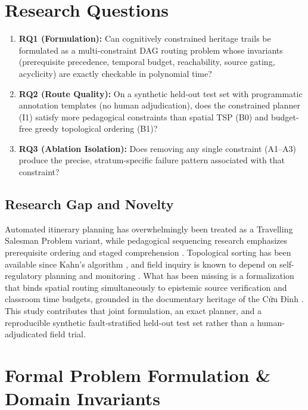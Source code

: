 \documentclass[11pt,a4paper]{article}
\begin{document}
\section{Research Questions}

\begin{enumerate}[label=\textbf{RQ\arabic*}, leftmargin=2.4em]
    \item \textbf{RQ1 (Formulation):} Can cognitively constrained heritage trails be formulated as a multi-constraint DAG routing problem whose invariants (prerequisite precedence, temporal budget, reachability, source gating, acyclicity) are exactly checkable in polynomial time?
    \item \textbf{RQ2 (Route Quality):} On a synthetic held-out test set with programmatic annotation templates (no human adjudication), does the constrained planner (I1) satisfy more pedagogical constraints than spatial TSP (B0) and budget-free greedy topological ordering (B1)?
    \item \textbf{RQ3 (Ablation Isolation):} Does removing any single constraint (A1--A3) produce the precise, stratum-specific failure pattern associated with that constraint?
\end{enumerate}

\subsection{Research Gap and Novelty}

Automated itinerary planning has overwhelmingly been treated as a Travelling Salesman Problem variant, while pedagogical sequencing research emphasizes prerequisite ordering and staged comprehension \cite{moet2018gdpt}. Topological sorting has been available since Kahn's algorithm \cite{kahn1962topological}, and field inquiry is known to depend on self-regulatory planning and monitoring \cite{zimmerman2000self}. What has been missing is a formalization that binds spatial routing simultaneously to epistemic source verification and classroom time budgets, grounded in the documentary heritage of the Cửu Đỉnh \cite{nguyen2026cuudinh}. This study contributes that joint formulation, an exact planner, and a reproducible synthetic fault-stratified held-out test set rather than a human-adjudicated field trial.

\section{Formal Problem Formulation \& Domain Invariants}
\end{document}
